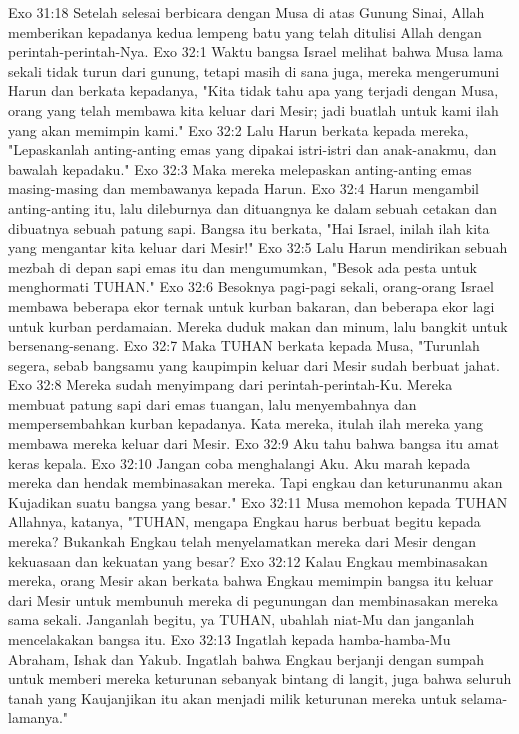 Exo 31:18  Setelah selesai berbicara dengan Musa di atas Gunung Sinai, Allah memberikan kepadanya kedua lempeng batu yang telah ditulisi Allah dengan perintah-perintah-Nya.
Exo 32:1  Waktu bangsa Israel melihat bahwa Musa lama sekali tidak turun dari gunung, tetapi masih di sana juga, mereka mengerumuni Harun dan berkata kepadanya, "Kita tidak tahu apa yang terjadi dengan Musa, orang yang telah membawa kita keluar dari Mesir; jadi buatlah untuk kami ilah yang akan memimpin kami."
Exo 32:2  Lalu Harun berkata kepada mereka, "Lepaskanlah anting-anting emas yang dipakai istri-istri dan anak-anakmu, dan bawalah kepadaku."
Exo 32:3  Maka mereka melepaskan anting-anting emas masing-masing dan membawanya kepada Harun.
Exo 32:4  Harun mengambil anting-anting itu, lalu dileburnya dan dituangnya ke dalam sebuah cetakan dan dibuatnya sebuah patung sapi. Bangsa itu berkata, "Hai Israel, inilah ilah kita yang mengantar kita keluar dari Mesir!"
Exo 32:5  Lalu Harun mendirikan sebuah mezbah di depan sapi emas itu dan mengumumkan, "Besok ada pesta untuk menghormati TUHAN."
Exo 32:6  Besoknya pagi-pagi sekali, orang-orang Israel membawa beberapa ekor ternak untuk kurban bakaran, dan beberapa ekor lagi untuk kurban perdamaian. Mereka duduk makan dan minum, lalu bangkit untuk bersenang-senang.
Exo 32:7  Maka TUHAN berkata kepada Musa, "Turunlah segera, sebab bangsamu yang kaupimpin keluar dari Mesir sudah berbuat jahat.
Exo 32:8  Mereka sudah menyimpang dari perintah-perintah-Ku. Mereka membuat patung sapi dari emas tuangan, lalu menyembahnya dan mempersembahkan kurban kepadanya. Kata mereka, itulah ilah mereka yang membawa mereka keluar dari Mesir.
Exo 32:9  Aku tahu bahwa bangsa itu amat keras kepala.
Exo 32:10  Jangan coba menghalangi Aku. Aku marah kepada mereka dan hendak membinasakan mereka. Tapi engkau dan keturunanmu akan Kujadikan suatu bangsa yang besar."
Exo 32:11  Musa memohon kepada TUHAN Allahnya, katanya, "TUHAN, mengapa Engkau harus berbuat begitu kepada mereka? Bukankah Engkau telah menyelamatkan mereka dari Mesir dengan kekuasaan dan kekuatan yang besar?
Exo 32:12  Kalau Engkau membinasakan mereka, orang Mesir akan berkata bahwa Engkau memimpin bangsa itu keluar dari Mesir untuk membunuh mereka di pegunungan dan membinasakan mereka sama sekali. Janganlah begitu, ya TUHAN, ubahlah niat-Mu dan janganlah mencelakakan bangsa itu.
Exo 32:13  Ingatlah kepada hamba-hamba-Mu Abraham, Ishak dan Yakub. Ingatlah bahwa Engkau berjanji dengan sumpah untuk memberi mereka keturunan sebanyak bintang di langit, juga bahwa seluruh tanah yang Kaujanjikan itu akan menjadi milik keturunan mereka untuk selama-lamanya."

